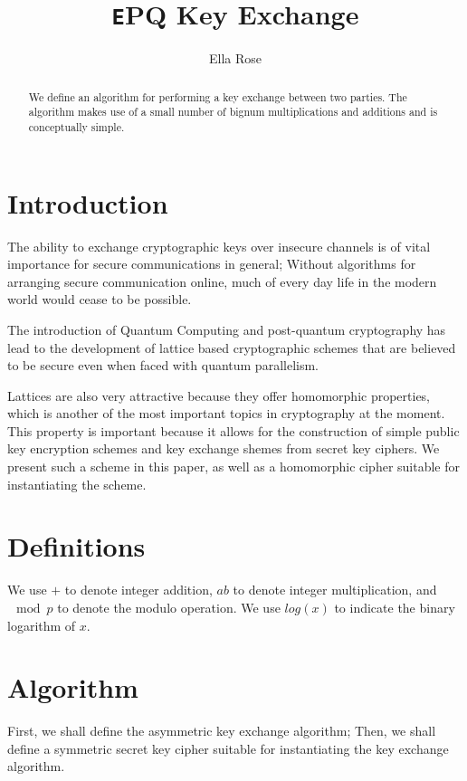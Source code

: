 \documentclass[preprint]{iacrtrans}
\author{Ella Rose\inst{1}}
\institute{Paso Robles, CA \email{python_pride@protonmail.com}}
\title[\texttt EPQ Key Exchange]{\texttt EPQ Key Exchange}
\begin{document}
\maketitle


\begin{abstract}
  We define an algorithm for performing a key exchange between two parties. The algorithm makes use of a small number of bignum multiplications and additions and is conceptually simple.\\ 
\end{abstract}

\todototoc
\listoftodos

\section{Introduction}
 The ability to exchange cryptographic keys over insecure channels is of vital importance for secure communications in general; Without algorithms for arranging secure communication online, much of every day life in the modern world would cease to be possible.

The introduction of Quantum Computing and post-quantum cryptography has lead to the development of lattice based cryptographic schemes that are believed to be secure even when faced with quantum parallelism. 

Lattices are also very attractive because they offer homomorphic properties, which is another of the most important topics in cryptography at the moment. This property is important because it allows for the construction of simple public key encryption schemes and key exchange shemes from secret key ciphers. We present such a scheme in this paper, as well as a homomorphic cipher suitable for instantiating the scheme.

\section{Definitions}
We use $+$ to denote integer addition, $ab$ to denote integer multiplication, and $\mod p$ to denote the modulo operation. We use $log(x)$ to indicate the binary logarithm of $x$.

\section{Algorithm}
First, we shall define the asymmetric key exchange algorithm; Then, we shall define a symmetric secret key cipher suitable for instantiating the key exchange algorithm.
\end{document}
